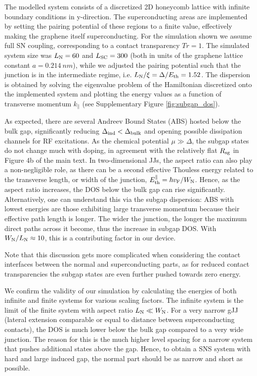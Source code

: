 The modelled system consists of a discretized 2D honeycomb lattice with infinite boundary conditions in y-direction.
The superconducting areas are implemented by setting the pairing potential of these regions to a finite value, effectively making the graphene itself superconducting.
For the simulation shown we assume full SN coupling, corresponding to a contact transparency $Tr=1$.
The simulated system size was $L_{\rm N}=60$ and $L_{\rm SC}=300$ (both in units of the graphene lattice constant $a=\SI{0.214}{nm}$), while we adjusted the pairing potential such that the junction is in the intermediate regime, i.e. $L_{\rm N}/\xi=\Delta/E_{\rm th} = 1.52$.
The dispersion is obtained by solving the eigenvalue problem of the Hamiltonian discretized onto the implemented system and plotting the energy values as a function of transverse momentum $k_\parallel$ (see Supplementary Figure \ref{fig:subgap_dos}).

As expected, there are several Andreev Bound States (ABS) hosted below the bulk gap, significantly reducing $\Delta_{\rm ind}<\Delta_{\rm bulk}$ and opening possible dissipation channels for RF excitations.
As the chemical potential $\mu\gg\Delta$, the subgap states do not change much with doping, in agreement with the relatively flat $R_{\rm sg}$ in Figure 4b of the main text.
In two-dimensional JJs, the aspect ratio can also play a non-negligible role, as there can be a second effective Thouless energy related to the transverse length, or width of the junction, $E_{\rm th}^\parallel=\hbar v_{\rm F}/W_{\rm N}$.
Hence, as the aspect ratio increases, the DOS below the bulk gap can rise significantly.
Alternatively, one can understand this via the subgap dispersion:
ABS with lowest energies are those exhibiting large transverse momentum because their effective path length is longer.
The wider the junction, the longer the maximum direct paths across it become, thus the increase in subgap DOS.
With $W_{\rm N}/L_{\rm N}\approx10$, this is a contributing factor in our device.

Note that this discussion gets more complicated when considering the contact interfaces between the normal and superconducting parts, as for reduced contact transparencies the subgap states are even further pushed towards zero energy.

We confirm the validity of our simulation by calculating the energies of both infinite and finite systems for various scaling factors.
The infinite system is the limit of the finite system with aspect ratio $L_{\rm N} \ll W_{\rm N}$.
For a very narrow gJJ (lateral extension comparable or equal to distance between superconducting contacts), the DOS is much lower below the bulk gap compared to a very wide junction.
The reason for this is the much higher level spacing for a narrow system that pushes additional states above the gap.
Hence, to obtain a SNS system with hard and large induced gap, the normal part should be as narrow and short as possible.

